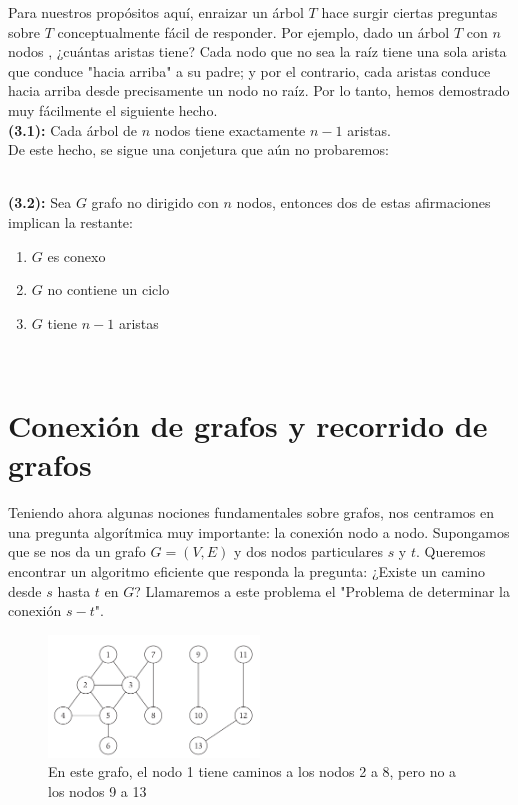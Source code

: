 \documentclass[a4paper, 12pt]{book}
\begin{document}
Para nuestros propósitos aquí, enraizar un árbol $T$  hace surgir ciertas preguntas sobre $T$ conceptualmente fácil de responder. Por ejemplo, dado un árbol $T$ con $n$ nodos , ¿cuántas aristas tiene? Cada nodo que no sea la raíz tiene una sola arista que conduce "hacia arriba" a su padre; y por el contrario, cada aristas conduce hacia arriba desde precisamente un nodo no raíz. Por lo tanto, hemos demostrado muy fácilmente el siguiente hecho. \\

\textbf{(3.1):} Cada árbol de $n$ nodos tiene exactamente $n- 1$ aristas. \\

De este hecho, se sigue una conjetura que aún no probaremos:\\
\\
 \colorbox{mygray}{\parbox{15cm}{
	\textbf{(3.2):} Sea $G$ grafo no dirigido con $n$ nodos, entonces dos de estas afirmaciones implican la restante:
    \begin{enumerate}
    \item $G$ es conexo
    \item $G$ no contiene un ciclo 
    \item $G$ tiene $n-1$ aristas
    \end{enumerate}

  }}\\

\section{Conexión de grafos y recorrido de grafos}
Teniendo ahora algunas nociones fundamentales sobre grafos, nos centramos en una pregunta algorítmica muy importante: la conexión nodo a nodo. Supongamos que se nos da un grafo $G = (V,E)$ y dos nodos particulares $s$ y $t$. Queremos encontrar un algoritmo eficiente que responda la pregunta: ¿Existe un camino desde $s$ hasta $t$ en $G$? Llamaremos a este problema el "Problema de determinar la conexión $s-t$".\\

\begin{figure}[h]
\centering
\includegraphics[width=0.5\textwidth]{Imagenes-Seccion3/fig32.png}
\caption{En este grafo, el nodo 1 tiene caminos a los nodos 2 a 8, pero no a los nodos 9 a 13}
\label{fig32}
\end{figure}
\end{document}
